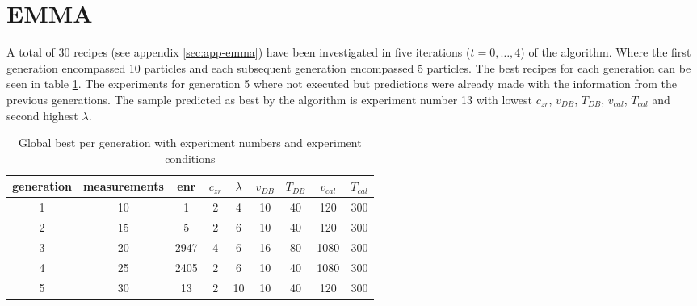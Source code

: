 \section{EMMA}
\label{sec:res-emma}
A total of 30 recipes (see appendix \ref{sec:app-emma}) have been investigated in 
five iterations ($t = 0, \dots, 4$) of the algorithm. 
Where the first generation encompassed 10 particles and each subsequent generation encompassed 5 particles. 
The best recipes for each generation can be seen in table \ref{tab:emma-Gb}. 
The experiments for generation 5 where not executed but 
predictions were already made
with the information from the previous generations. 
The sample predicted as best by the algorithm is experiment number 13 with 
lowest $c_{zr}$, $v_{DB}$, $T_{DB}$, $v_{cal}$, $T_{cal}$ and second highest $\lambda$. 

\begin{table}[htb]
	\centering
	\caption{Global best per generation with experiment numbers and experiment conditions}%
	\label{tab:emma-Gb}
	\begin{tabular}{ccccccccc}
        \hline\hline
		generation& measurements &enr &$c_{zr}$ &$\lambda$ &$v_{DB}$ &$T_{DB}$ &$v_{cal}$ &$T_{cal}$\\
        \hline
	1  &10	&1       &2    &4   &10   &40  &120  &300\\
	2  &15	&5       &2    &6   &10   &40  &120  &300\\
	3  &20	&2947    &4    &6   &16   &80 &1080  &300\\
	4  &25	&2405    &2    &6   &10   &40 &1080  &300\\
	5  &30	&13      &2   &10   &10   &40  &120  &300\\
    \hline\hline
	\end{tabular}
\end{table}

